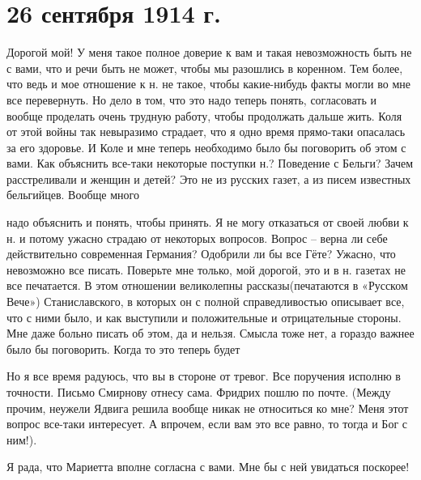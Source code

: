 \section{26 сентября 1914 г.}


Дорогой мой! У меня такое полное доверие к вам и такая невозможность быть не с
вами, что и речи быть не может, чтобы мы разошлись в коренном. Тем более, что
ведь и мое отношение к н.  не такое, чтобы какие-нибудь факты могли
во мне все перевернуть. Но дело в том, что это надо теперь понять, согласовать
и вообще проделать очень трудную работу, чтобы продолжать дальше жить. Коля от
этой войны так невыразимо страдает, что я одно время прямо-таки опасалась за
его здоровье. И Коле и мне теперь необходимо было бы поговорить об этом с вами.
Как объяснить все-таки некоторые поступки н.? Поведение с Бельги?
Зачем расстреливали и женщин и детей? Это не из русских газет, а из писем
известных бельгийцев. Вообще много


\noindent
надо объяснить и понять, чтобы принять. Я не могу отказаться от своей любви к
н. и потому ужасно страдаю от некоторых вопросов. Вопрос -- верна ли себе
действительно современная Германия? Одобрили ли бы все Гёте? Ужасно, что
невозможно все писать. Поверьте мне только, мой дорогой, это и в н.
 газетах не все печатается. В этом отношении великолепны
рассказы(печатаются в «Русском Вече») Станиславского, в которых он с полной
справедливостью описывает все, что с ними было, и как выступили и положительные
и отрицательные стороны. Мне даже больно писать об этом, да и нельзя. Смысла
тоже нет, а гораздо важнее было бы поговорить. Когда то это теперь
будет\textellipsis

Но я все время радуюсь, что вы в стороне от тревог. Все поручения исполню в
точности. Письмо Смирнову отнесу сама. Фридрих пошлю по почте. (Между прочим,
неужели Ядвига решила вообще никак не относиться ко мне? Меня этот вопрос
все-таки интересует. А впрочем, если вам это все равно, то тогда и Бог с ним!).


Я рада, что Мариетта вполне согласна с вами. Мне бы с ней увидаться поскорее!
